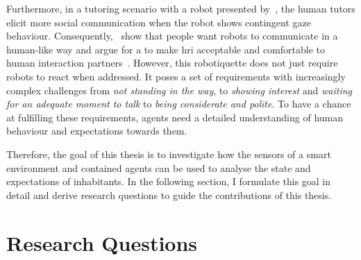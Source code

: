 Furthermore, in a tutoring scenario with a \gls{robot} presented by~, the human tutors elicit more social communication when the \gls{robot} shows contingent gaze behaviour.
Consequently,~ show that people want \glspl{robot} to communicate in a human-like way and argue for a to make \gls{hri} acceptable and comfortable to human interaction partners~\cite{Dautenhahn2005,dautenhahn2007socially}.
However, this \gls{robotiquette} does not just require \glspl{robot} to react when addressed.
It poses a set of requirements with increasingly complex challenges from \emph{not standing in the way}, to \emph{showing interest} and \emph{waiting for an adequate moment to talk} to \emph{being considerate and polite}.
To have a chance at fulfilling these requirements, agents need a detailed understanding of human behaviour and expectations towards them.

Therefore, the goal of this thesis is to investigate how the sensors of a \gls{smart environment} and contained agents can be used to analyse the  state and expectations of inhabitants.
In the following section, I formulate this goal in detail and derive research questions to guide the contributions of this thesis.

\section{Research Questions}\label{sec.hypotheses}

